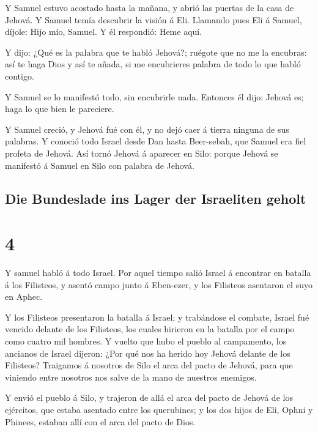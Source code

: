  Y Samuel estuvo acostado hasta la mañana, y abrió las
puertas de la casa de Jehová. Y Samuel temía descubrir la visión á Eli.
 Llamando pues Eli á Samuel, díjole: Hijo mío, Samuel. Y él
respondió: Heme aquí.

 Y dijo: ¿Qué es la palabra que te habló Jehová?; ruégote
que no me la encubras: así te haga Dios y así te añada, si me
encubrieres palabra de todo lo que habló contigo.

 Y Samuel se lo manifestó todo, sin encubrirle nada.
Entonces él dijo: Jehová es; haga lo que bien le pareciere.

 Y Samuel creció, y Jehová fué con él, y no dejó caer á
tierra ninguna de sus palabras.  Y conoció todo Israel
desde Dan hasta Beer-sebah, que Samuel era fiel profeta de Jehová.
 Así tornó Jehová á aparecer en Silo: porque Jehová se
manifestó á Samuel en Silo con palabra de Jehová.

\hypertarget{die-bundeslade-ins-lager-der-israeliten-geholt}{%
\subsection{Die Bundeslade ins Lager der Israeliten
geholt}\label{die-bundeslade-ins-lager-der-israeliten-geholt}}

\hypertarget{section-3}{%
\section{4}\label{section-3}}

 Y samuel habló á todo Israel. Por aquel tiempo salió Israel
á encontrar en batalla á los Filisteos, y asentó campo junto á
Eben-ezer, y los Filisteos asentaron el suyo en Aphec.

 Y los Filisteos presentaron la batalla á Israel; y
trabándose el combate, Israel fué vencido delante de los Filisteos, los
cuales hirieron en la batalla por el campo como cuatro mil hombres.
 Y vuelto que hubo el pueblo al campamento, los ancianos de
Israel dijeron: ¿Por qué nos ha herido hoy Jehová delante de los
Filisteos? Traigamos á nosotros de Silo el arca del pacto de Jehová,
para que viniendo entre nosotros nos salve de la mano de nuestros
enemigos.

 Y envió el pueblo á Silo, y trajeron de allá el arca del
pacto de Jehová de los ejércitos, que estaba asentado entre los
querubines; y los dos hijos de Eli, Ophni y Phinees, estaban allí con el
arca del pacto de Dios.

